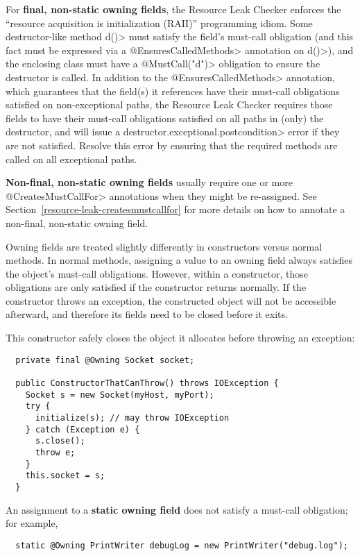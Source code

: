 For \textbf{final, non-static owning fields},
the Resource Leak Checker enforces the ``resource acquisition is
initialization (RAII)'' programming idiom.  Some
destructor-like method \<d()> must satisfy the field's must-call obligation
(and this fact must be expressed via a \<@EnsuresCalledMethods> annotation on \<d()>),
and the enclosing class must have a \<@MustCall("d")> obligation to
ensure the destructor is called. In addition to the \<@EnsuresCalledMethods> annotation,
which guarantees that the field(s) it references have their must-call obligations satisfied
on non-exceptional paths, the Resource Leak Checker requires those fields to have their must-call
obligations satisfied on all paths in (only) the destructor, and will issue a \<destructor.exceptional.postcondition>
error if they are not satisfied. Resolve this error by ensuring that the required methods are called
on all exceptional paths.

\textbf{Non-final, non-static owning fields} usually require one or more \<@CreatesMustCallFor> annotations
when they might be re-assigned. See Section~\ref{resource-leak-createsmustcallfor} for
more details on how to annotate a non-final, non-static owning field.

Owning fields are treated slightly differently in constructors versus normal methods.
In normal methods, assigning a value to an owning field always satisfies the object's
must-call obligations.  However, within a constructor, those obligations are only
satisfied if the constructor returns normally.  If the constructor throws an exception,
the constructed object will not be accessible afterward, and therefore its fields need
to be closed before it exits.

This constructor safely closes the object it allocates before throwing an exception:
\begin{verbatim}
  private final @Owning Socket socket;

  public ConstructorThatCanThrow() throws IOException {
    Socket s = new Socket(myHost, myPort);
    try {
      initialize(s); // may throw IOException
    } catch (Exception e) {
      s.close();
      throw e;
    }
    this.socket = s;
  }
\end{verbatim}

An assignment to a \textbf{static owning field} does not satisfy a
must-call obligation; for example,

\begin{smaller}
\begin{Verbatim}
  static @Owning PrintWriter debugLog = new PrintWriter("debug.log");
\end{Verbatim}
\end{smaller}

